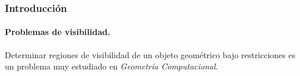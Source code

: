 {
\begin{frame}
  \frametitle{Introducción}
  \framesubtitle{Problemas de visibilidad.} %
  Determinar regiones de visibilidad de un objeto geométrico bajo restricciones es
  un problema muy estudiado en \textit{Geometría Computacional}.
  

\end{frame}}
